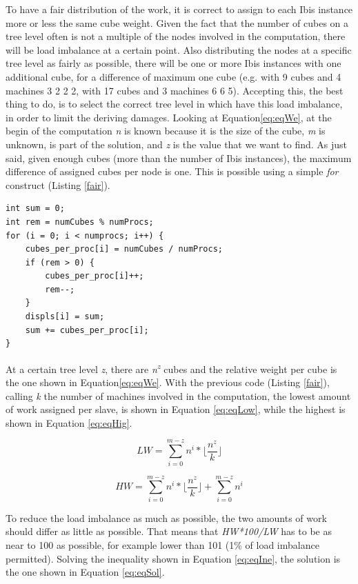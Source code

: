 \documentclass[a4paper]{article}
\begin{document}
To have a fair distribution of the work, it is correct to assign to each Ibis instance more or less the same cube weight. Given the fact that the number of cubes on a tree level often is not a multiple of the nodes involved in the computation, there will be load imbalance at a certain point. Also distributing the nodes at a specific tree level as fairly as possible, there will be one or more Ibis instances with one additional cube, for a difference of maximum one cube (e.g. with 9 cubes and 4 machines 3 2 2 2, with 17 cubes and 3 machines 6 6 5). Accepting this, the best thing to do, is to select the correct tree level in which have this load imbalance, in order to limit the deriving damages. Looking at Equation\ref{eq:eqWe}, at the begin of the computation \textit{n} is known because it is the size of the cube, \textit{m} is unknown, is part of the solution, and \textit{z} is the value that we want to find. As just said, given enough cubes (more than the number of Ibis instances), the maximum difference of assigned cubes per node is one. This is possible using a simple \textit{for} construct (Listing \ref{fair}).

\begin{lstlisting}[label=fair, caption=fair distribution of cubes]
int sum = 0;
int rem = numCubes % numProcs; 
for (i = 0; i < numprocs; i++) {
    cubes_per_proc[i] = numCubes / numProcs;
    if (rem > 0) {
        cubes_per_proc[i]++;
        rem--;
    }
    displs[i] = sum;
    sum += cubes_per_proc[i];
}
\end{lstlisting}
\FloatBarrier

At a certain tree level \textit{z}, there are \textit{n\textsuperscript{z}} cubes and the relative weight per cube is the one shown in Equation\ref{eq:eqWe}. With the previous code (Listing \ref{fair}), calling \textit{k} the number of machines involved in the computation, the lowest amount of work assigned per slave, is shown in Equation \ref{eq:eqLow}, while the highest is shown in Equation \ref{eq:eqHig}. 

\begin{equation} 
\label{eq:eqLow}
LW=\sum_{i=0}^{m-z}{n^i}*\lfloor\frac{n^z}{k}\rfloor
\end{equation}
\FloatBarrier

\begin{equation} 
\label{eq:eqHig}
HW=\sum_{i=0}^{m-z}{n^i}*\lfloor\frac{n^z}{k}\rfloor +  \sum_{i=0}^{m-z}{n^i}
\end{equation}
\FloatBarrier

To reduce the load imbalance as much as possible, the two amounts of work should differ as little as possible. That means that \textit{HW*100/LW} has to be as near to 100 as possible, for example lower than 101 (1\% of load imbalance permitted). Solving the inequality shown in Equation \ref{eq:eqIne}, the solution is the one shown in Equation \ref{eq:eqSol}. 
\end{document}
